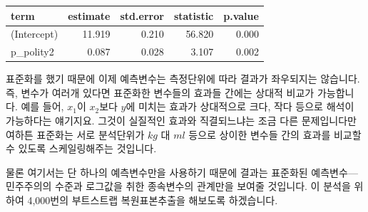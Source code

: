 \documentclass[
]{book}
\begin{document}
\begin{tabular}{l|r|r|r|r}
\hline
term & estimate & std.error & statistic & p.value\\
\hline
(Intercept) & 11.919 & 0.210 & 56.820 & 0.000\\
\hline
p\_polity2 & 0.087 & 0.028 & 3.107 & 0.002\\
\hline
\end{tabular}

표준화를 했기 때문에 이제 예측변수는 측정단위에 따라 결과가 좌우되지는 않습니다. 즉, 변수가 여러개 있다면 표준화한 변수들의 효과들 간에는 상대적 비교가 가능합니다. 예를 들어, \(x_1\)이 \(x_2\)보다 \(y\)에 미치는 효과가 상대적으로 크다, 작다 등으로 해석이 가능하다는 얘기지요. 그것이 실질적인 효과와 직결되느냐는 조금 다른 문제입니다만 여하튼 표준화는 서로 분석단위가 \(kg\) 대 \(ml\) 등으로 상이한 변수들 간의 효과를 비교할 수 있도록 스케일링해주는 것입니다.

물론 여기서는 단 하나의 예측변수만을 사용하기 때문에 결과는 표준화된 예측변수---민주주의의 수준과 로그값을 취한 종속변수의 관계만을 보여줄 것입니다. 이 분석을 위하여 4,000번의 부트스트랩 복원표본추출을 해보도록 하겠습니다.
\end{document}

